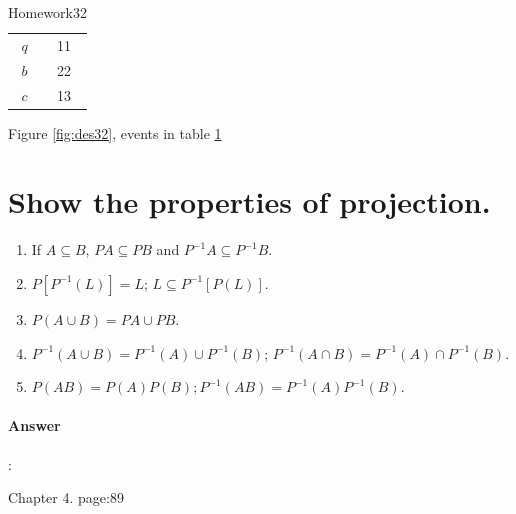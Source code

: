\documentclass{article}
\begin{document}
\begin{table}
  \centering
  \begin{tabular}{|c|c|}
    $q$ & 11\\
    $b$ & 22\\
    $c$ & 13\\
  \end{tabular}
  \caption{Homework32}
  \label{tab:des32}
\end{table}

Figure \ref{fig:des32}, events in table \ref{tab:des32}

\section{Show the properties of projection.}

\begin{enumerate}
  \item If $A \subseteq B$, $P A \subseteq P B$ and $P^{-1}A \subseteq P^{-1}B$.
  \item $P [P^{-1}(L)] = L$; $L \subseteq P^{-1}[P (L)]$.
  \item $P (A \cup B) = P A \cup P B$.
  \item $P^{-1} (A \cup B) = P^{-1} (A) \cup P^{-1} (B)$; $P^{-1} (A \cap B) = P^{-1} (A) \cap P^{-1} (B)$.
  \item $P (AB) = P (A)P (B); P^{-1} (AB) = P^{-1} (A)P^{-1}(B)$.
\end{enumerate}

\paragraph{Answer}:

Chapter 4. page:89
\end{document}
